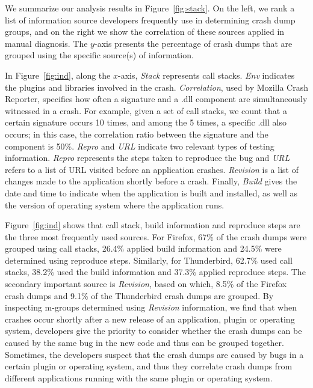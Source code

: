We summarize our analysis results in Figure~\ref{fig:stack}. On the left, we rank a list of information source developers frequently use in determining crash dump groups, and on the right we show the correlation of these sources applied in manual diagnosis. The $y$-axis presents the percentage of crash dumps that are grouped using the specific source(s) of information.

In Figure~\ref{fig:ind}, along the $x$-axis, {\it Stack} represents call stacks. {\it Env} indicates the plugins and libraries involved in the crash. {\it Correlation}, used by Mozilla Crash Reporter, specifies how often a signature and a .dll component are simultaneously witnessed in a crash. For example, given a set of call stacks, we count that a certain signature occurs 10 times, and among the 5 times, a specific .dll also occurs; in this case, the correlation ratio between the signature and the component is 50\%. {\it Repro} and {\it URL} indicate two relevant types of testing information. {\it Repro} represents the steps taken to reproduce the bug and {\it URL} refers to a list of URL visited before an application crashes. {\it Revision} is a list of changes made to the application shortly before a crash. Finally, {\it Build} gives the date and time to indicate when the application is built and installed, as well as the version of operating system where the application runs.

Figure~\ref{fig:ind} shows that call stack, build information and reproduce steps are the three most frequently used sources. For Firefox, 67\% of the crash dumps were grouped using call stacks, 26.4\% applied build information and 24.5\% were determined using reproduce steps. Similarly, for Thunderbird, 62.7\% used call stacks,  38.2\% used the build information and 37.3\% applied reproduce steps. The secondary important source is {\it Revision}, based on which, 8.5\% of the Firefox crash dumps and 9.1\% of the Thunderbird crash dumps are grouped. By inspecting m-groups determined using {\it Revision} information, we find that when crashes occur shortly after a new release of an application, plugin or operating system, developers give the priority to consider whether the crash dumps can be caused by the same bug in the new code and thus can be grouped together. Sometimes, the developers suspect that the crash dumps are caused by bugs in a certain plugin or operating system, and thus they correlate crash dumps from different applications running with the same plugin or operating system.


